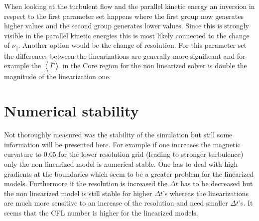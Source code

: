 \documentclass[master.tex]{subfiles}
\begin{document}
When looking at the turbulent flow and the parallel kinetic energy an inversion in respect to the first parameter set happens where the first group now generates higher values and the second group generates lower values. Since this is strongly visible in the parallel kinetic energies this is most likely connected to the change of $\nu_\parallel$. Another option would be the change of resolution.\newline
For this parameter set the differences between the linearizations are generally more significant and for example the $\left< \overline{\Gamma} \right>$ in the Core region for the non linearized solver is double the magnitude of the linearization one.




\section{Numerical stability}
Not thoroughly measured was the stability of the simulation but still some information will be presented here. For example if one increases the magnetic curvature to 0.05 for the lower resolution grid (leading to stronger turbulence) only the non linearized model is numerical stable. One has to deal with high gradients at the boundaries which seem to be a greater problem for the linearized models. 
Furthermore if the resolution is increased the $\Delta t$ has to be decreased but the non linearized model is still stable for higher $\Delta t$'s whereas the linearizations are much more sensitive to an increase of the resolution and need smaller $\Delta t$'s. It seems that the \ac{CFL} number is higher for the linearized models.
\end{document}
